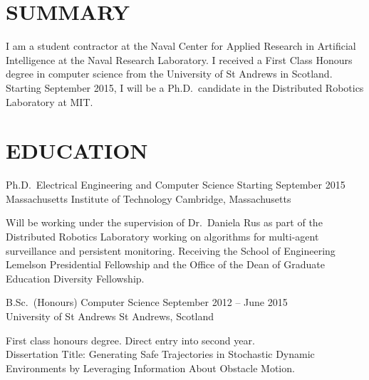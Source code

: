 \documentclass[line,margin]{cv}
\begin{document}
\address{Email: \href{mailto:alex@wallar.me}{alex@wallar.me}
\\Website: \href{http://wallar.me}
{http://wallar.me}}
\address{Last Updated: \today}

\begin{resume}

\section{SUMMARY}

I am a student contractor at the Naval Center for Applied Research in
Artificial Intelligence at the Naval Research Laboratory. I received a First
Class Honours degree in computer science from the University of St Andrews in
Scotland. Starting September 2015, I will be a Ph.D.\ candidate in the
Distributed Robotics Laboratory at MIT.

\section{EDUCATION}

Ph.D.\ Electrical Engineering and Computer Science
\hfill Starting September 2015 \\
Massachusetts Institute of Technology \hfill Cambridge, Massachusetts
\begin{adjustwidth}{2.5em}{2.5em}

    Will be working under the supervision of Dr.\ Daniela Rus as part of the
    Distributed Robotics Laboratory working on algorithms for multi-agent
    surveillance and persistent monitoring. Receiving the School of Engineering
    Lemelson Presidential Fellowship and the Office of the Dean of Graduate
    Education Diversity Fellowship.

\end{adjustwidth}

B.Sc.\ (Honours) Computer Science
\hfill September 2012 -- June 2015 \\
University of St Andrews \hfill St Andrews, Scotland
\begin{adjustwidth}{2.5em}{2.5em}

    First class honours degree. Direct entry into second year.\\ Dissertation
    Title: Generating Safe Trajectories in Stochastic Dynamic Environments by
    Leveraging Information About Obstacle Motion.

\end{adjustwidth}


\end{resume}
\end{document}
